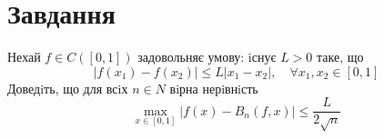 

\chapter{Завдання \theHchapter}

\begin{tcolorbox}[title=Завдання]
    Нехай $f \in C([0, 1])$ задовольняє умову: iснує $L > 0$ таке, що
    $$ |f(x_1) - f(x_2)| \le L|x_1 - x_2|, 
    \quad \forall x_1,x_2 \in [0, 1] $$
    Доведiть, що для всiх $n \in N$ вiрна нерiвнiсть
    $$ \max\limits_{x\in [0, 1]} |f(x) - B_n(f, x)| 
    \le \frac{L}{2\sqrt{n}} $$
\end{tcolorbox}


